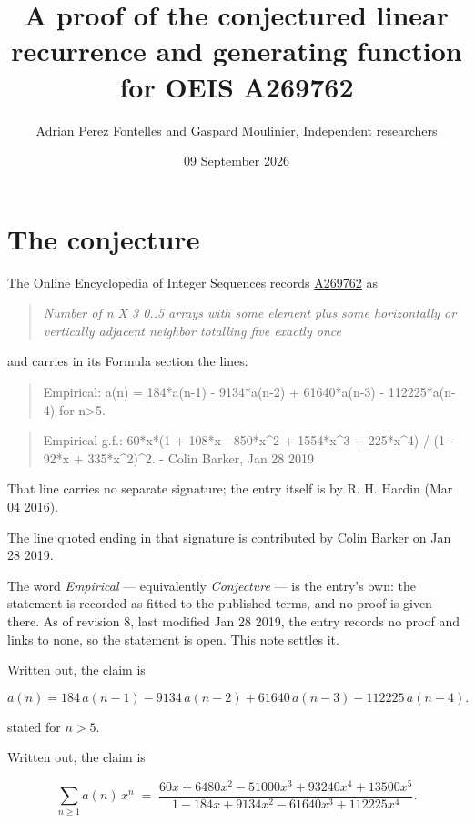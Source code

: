 \documentclass[11pt]{article}
\title{A proof of the conjectured linear recurrence and generating function for OEIS A269762}
\author{Adrian Perez Fontelles and Gaspard Moulinier, Independent researchers}
\date{09 September 2026}
\theoremstyle{definition}
\begin{document}
\maketitle
\section{The conjecture}

The Online Encyclopedia of Integer Sequences records \href{https://oeis.org/A269762}{A269762} as

\begin{quote}\itshape Number of n X 3 0..5 arrays with some element plus some horizontally or vertically adjacent neighbor totalling five exactly once\end{quote}

and carries in its Formula section the lines:

\begin{quote}\ttfamily Empirical: a(n) = 184*a(n-1) - 9134*a(n-2) + 61640*a(n-3) - 112225*a(n-4) for n>5.\end{quote}

\begin{quote}\ttfamily Empirical g.f.: 60*x*(1 + 108*x - 850*x\textasciicircum{}2 + 1554*x\textasciicircum{}3 + 225*x\textasciicircum{}4) / (1 - 92*x + 335*x\textasciicircum{}2)\textasciicircum{}2. - Colin Barker, Jan 28 2019\end{quote}

That line carries no separate signature; the entry itself is by R. H. Hardin (Mar 04 2016).

The line quoted ending in that signature is contributed by Colin Barker on Jan 28 2019.

The word {\itshape Empirical} --- equivalently {\itshape Conjecture} --- is the entry's own: the statement is recorded as fitted to the published terms, and no proof is given there. As of revision 8, last modified Jan 28 2019, the entry records no proof and links to none, so the statement is open. This note settles it.

Written out, the claim is

\[a(n) = 184\,a(n-1) - 9134\,a(n-2) + 61640\,a(n-3) - 112225\,a(n-4).\]

stated for $n > 5$.

Written out, the claim is

\[\sum_{n \ge 1} a(n)\,x^n \;=\; \frac{60x + 6480x^{2} - 51000x^{3} + 93240x^{4} + 13500x^{5}}{1 - 184x + 9134x^{2} - 61640x^{3} + 112225x^{4}}.\]
\end{document}
